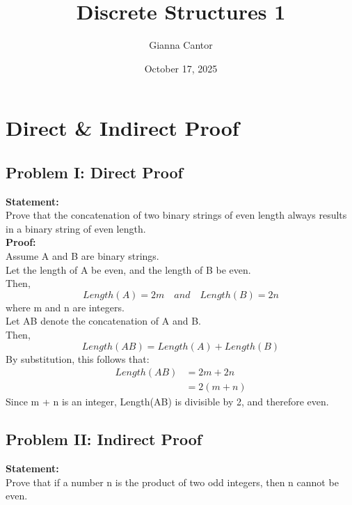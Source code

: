 \documentclass{book}
\title{Discrete Structures 1}
\author{Gianna Cantor}
\date{October 17, 2025}
\begin{document}
\maketitle

\chapter{Direct \& Indirect Proof}

\section{Problem I: Direct Proof}

\textbf{Statement:} \\
Prove that the concatenation of two binary strings of even length always results in a binary string of even length. \\

\textbf{Proof:} \\
Assume A and B are binary strings. \\
Let the length of A be even, and the length of B be even. \\
Then, \\
\begin{equation*}
    Length(A) = 2m \quad and \quad Length(B) = 2n
\end{equation*}
where m and n are integers. \\
Let AB denote the concatenation of A and B. \\
Then, \\
\begin{equation*}
    Length(AB) = Length(A) + Length(B)
\end{equation*}
By substitution, this follows that: \\
\begin{equation*}
\begin{split}
    Length(AB) & = 2m + 2n \\
               & = 2(m + n)
\end{split}
\end{equation*}
Since m + n is an integer, Length(AB) is divisible by 2, and therefore even. \\

\vspace{1em}

\section{Problem II: Indirect Proof}
\textbf{Statement:} \\
Prove that if a number n is the product of two odd integers, then n cannot be even. \\
\end{document}
